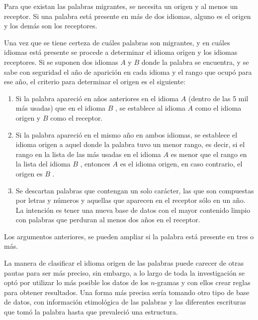 
Para que existan las palabras migrantes, se necesita un origen y al menos un
receptor. Si una palabra está presente en más de dos idiomas, alguno es el
origen y los demás son los receptores. 

Una vez que se tiene certeza de cuáles palabras son migrantes, y en cuáles
idiomas está presente se procede a determinar el idioma origen y los idiomas
receptores.   Si se suponen dos idiomas $\textit{A}$ y $\textit{B}$  donde la
palabra se encuentra, y se sabe con seguridad el año de aparición en cada
idioma y el rango que ocupó para ese año,  el criterio para determinar el
origen es el siguiente: 
\begin{enumerate}
\item  Si la palabra apareció en años anteriores en el idioma $\textit{A}$
(dentro de las 5 mil más usadas) que en el idioma $\textit{B}$ , se establece
al idioma $\textit{A}$  como el idioma origen y $\textit{B}$  como el receptor.
\item Si la palabra apareció en el mismo año en ambos idiomas, se establece el
idioma origen a aquel donde la palabra tuvo un menor rango, es decir, si el
rango en la lista de las más usadas en el idioma $\textit{A}$  es menor que el
rango en la lista del idioma $\textit{B}$ , entonces $\textit{A}$  es el idioma
origen, en caso contrario, el origen es $\textit{B}$ .
\item Se descartan palabras que contengan un solo carácter, las que son
compuestas por letras y números y aquellas que aparecen en el receptor sólo en un año. La intención es tener una  nueva base de datos con el mayor contenido
limpio con palabras que perduran al menos dos años en el receptor.

\end{enumerate}

Los argumentos anteriores, se pueden ampliar si la palabra está presente en tres o más.

{}
La manera de clasificar el idioma origen de las palabras puede carecer de otras
pautas para ser más preciso, sin embargo, a lo largo de toda la investigación
se optó por utilizar lo más posible los datos de los $n$-gramas y  con ellos
crear reglas para obtener resultados.  Una forma más precisa sería tomando otro
tipo de base de datos, con información etimológica de las palabras y las
diferentes escrituras que tomó la palabra hasta que prevaleció una estructura.  

